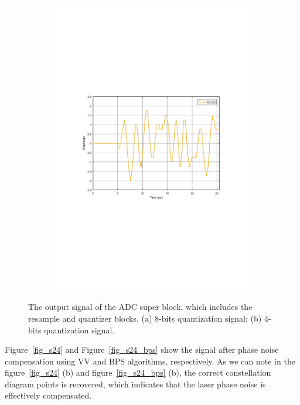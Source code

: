 \begin{refsection}
\begin{figure}[h!]
\begin{subfigure}{.5\textwidth}
  \includegraphics[width=\linewidth]{./sdf/dsp_laser_phase_compensation/figures/S21_td_4bits.pdf}
  \caption{}
  \label{fig:sub2}
\end{subfigure}
\caption{The output signal of the ADC super block, which includes the resample and quantizer blocks. (a) 8-bits quantization signal; (b)  4-bits quantization signal.}
\label{fig_s21}
\end{figure}

\pagebreak

Figure~\ref{fig_s24} and Figure~\ref{fig_s24_bps} show the signal after phase noise compensation using VV and BPS algorithms, respectively. As we can note in the figure~\ref{fig_s24} (b) and figure~\ref{fig_s24_bps} (b), the correct constellation diagram points is recovered, which indicates that the laser phase noise is effectively compensated.


\end{refsection}
